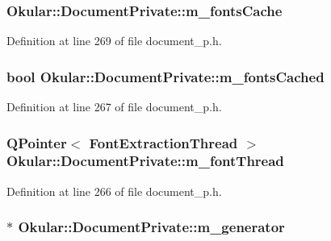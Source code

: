 \hypertarget{classOkular_1_1DocumentPrivate_a9be70502279da0a275889e504409c7e5}{
\subsubsection[{m\+\_\+fonts\+Cache}]{ Okular\+::\+Document\+Private\+::m\+\_\+fonts\+Cache}}\label{classOkular_1_1DocumentPrivate_a9be70502279da0a275889e504409c7e5}


Definition at line 269 of file document\+\_\+p.\+h.

\hypertarget{classOkular_1_1DocumentPrivate_aa33ab887df80e7df7c9d7a5eecff000e}{
\subsubsection[{m\+\_\+fonts\+Cached}]{\setlength{\rightskip}{0pt plus 5cm}bool Okular\+::\+Document\+Private\+::m\+\_\+fonts\+Cached}}\label{classOkular_1_1DocumentPrivate_aa33ab887df80e7df7c9d7a5eecff000e}


Definition at line 267 of file document\+\_\+p.\+h.

\hypertarget{classOkular_1_1DocumentPrivate_a7d89f5349531b52b4109855269a6a4c4}{
\subsubsection[{m\+\_\+font\+Thread}]{\setlength{\rightskip}{0pt plus 5cm}Q\+Pointer$<$ {\bf Font\+Extraction\+Thread} $>$ Okular\+::\+Document\+Private\+::m\+\_\+font\+Thread}}\label{classOkular_1_1DocumentPrivate_a7d89f5349531b52b4109855269a6a4c4}


Definition at line 266 of file document\+\_\+p.\+h.

\hypertarget{classOkular_1_1DocumentPrivate_a52083f79ce95756ddea060e74315e91f}{
\subsubsection[{m\+\_\+generator}]{$\ast$ Okular\+::\+Document\+Private\+::m\+\_\+generator}}\label{classOkular_1_1DocumentPrivate_a52083f79ce95756ddea060e74315e91f}


